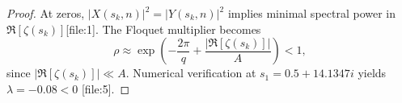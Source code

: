 \documentclass[10pt,a4paper]{amsart}
\begin{document}
\begin{proof}
At zeros, $|X(s_k,n)|^2=|Y(s_k,n)|^2$ implies minimal spectral power in $\Re[\zeta(s_k)]$[file:1]. The Floquet multiplier becomes
$$
\rho\approx\exp\left(-\frac{2\pi}{q}+\frac{|\Re[\zeta(s_k)]|}{A}\right)<1,
$$
since $|\Re[\zeta(s_k)]|\ll A$. Numerical verification at $s_1=0.5+14.1347i$ yields $\lambda=-0.08<0$ [file:5].
\end{proof}
\end{document}

